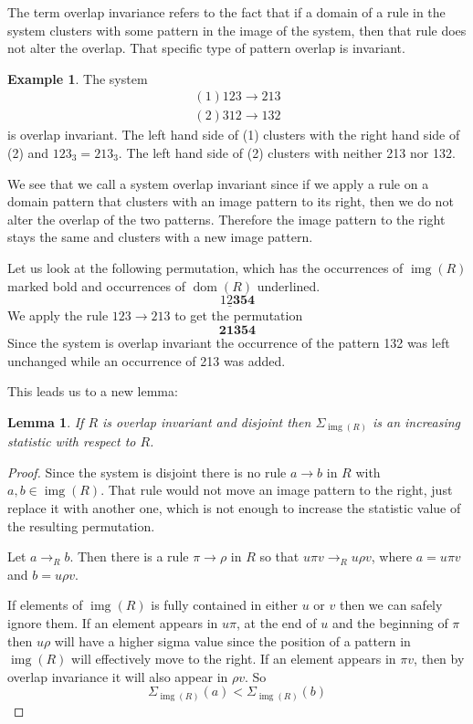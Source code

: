 \documentclass[a4paper, 11pt, english]{article}
\newcommand{\patternrule}{ \to \!}
\newtheorem{lemma}[theorem]{Lemma}
\theoremstyle{definition}
\newtheorem{example}[theorem]{Example}
\DeclareMathOperator{\dom}{dom}
\DeclareMathOperator{\img}{img}
\begin{document}
The term overlap invariance refers to the fact that if a domain of a rule in the system clusters
with some pattern in the image of the system, then that rule does not alter the overlap. That
specific type of pattern overlap is invariant.

\begin{example}
  The system
  \begin{align*}
    (1) 123 \patternrule 213 \\
    (2) 312 \patternrule 132
  \end{align*}
  is overlap invariant. The left hand side of (1) clusters with the right hand side of (2) and 
  $123_3 = 213_3$. The left hand side of (2) clusters with neither 213 nor 132.

  We see that we call a system overlap invariant since if we apply a rule on a domain pattern that clusters
  with an image pattern to its right, then we do not alter the overlap of the two patterns.
  Therefore the image pattern to the right stays the same and clusters with a new image pattern.
  
  Let us look at the following permutation, which has the occurrences of $\img(R)$ marked bold and
  occurrences of $\dom(R)$ underlined.
  \[
    \underline{12\bm{3}}\bm{54}
  \]
  We apply the rule $123 \patternrule 213$ to get the permutation
  \[
    \bm{21\bm{3}}\bm{54}
  \]
  Since the system is overlap invariant the occurrence of the pattern 132 was left unchanged while
  an occurrence of 213 was added.
\end{example}

This leads us to a new lemma:

\begin{lemma}
  If $R$ is overlap invariant and disjoint then $\Sigma_{\img(R)}$ is an increasing statistic with respect to $R$. 
\end{lemma}
\begin{proof}
  Since the system is disjoint there is no rule $a \patternrule b$ in $R$ with $a, b \in \img(R)$.
  That rule would not move an image pattern to the right, just replace it with another one, which is
  not enough to increase the statistic value of the resulting permutation.

    Let $a \to_R b$. Then there is a rule $\pi \patternrule \rho$ in
    $R$ so that $u \pi v \to_R u \rho v$, where $a = u \pi v$ and $b =
    u \rho v$. 

    If elements of $\img(R)$ is fully contained in either $u$ or $v$ then we
    can safely ignore them. If an element appears in $u\pi$, at the end of $u$ and the beginning of
    $\pi$ then $u \rho$ will have a higher sigma value since the position of a pattern in $\img(R)$ will
    effectively move to the right. If an element appears in $\pi v$,
    then by overlap invariance it will also appear in $\rho v$.
    So
    \[
        \Sigma_{\img(R)}(a) < \Sigma_{\img(R)}(b)
    \]

\end{proof}
\end{document}
